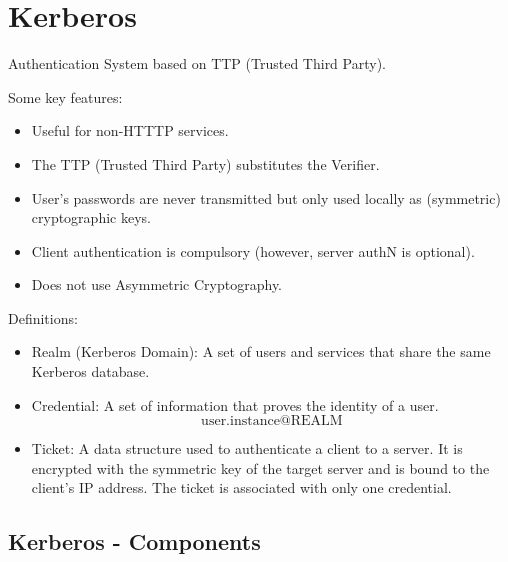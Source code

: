 \section{Kerberos}
\begin{center}
    Authentication System based on TTP (Trusted Third Party).
\end{center}



\begin{multicols}{2}
    \raggedcolumns

    \begin{center}
        Some key features:
    \end{center}
    \begin{itemize}
        \item Useful for non-HTTTP services.
        \item The TTP (Trusted Third Party) substitutes the Verifier.
        \item User's passwords are never transmitted but only used locally as (symmetric) cryptographic keys.
        \item Client authentication is compulsory (however, server authN is optional).
        \item Does not use Asymmetric Cryptography.
    \end{itemize}
\columnbreak

\begin{center}
    Definitions:
\end{center}
\begin{itemize}
    \item Realm (Kerberos Domain): A set of users and services that share the same Kerberos database.
    \item Credential: A set of information that proves the identity of a user.
    \[
        \text{user.instance@REALM}
    \]
    \item Ticket: A data structure used to authenticate a client to a server. It is encrypted with the symmetric key of the target server and is bound to the client’s IP address. The ticket is associated with only one credential.

\end{itemize}
\end{multicols}

\subsection*{Kerberos - Components}




